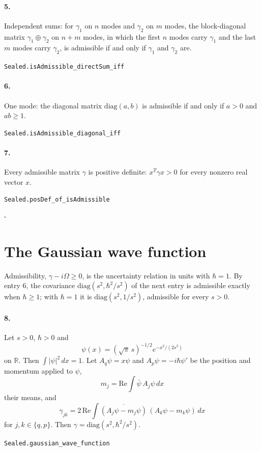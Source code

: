 \documentclass[11pt]{article}
\makeatletter
\newcommand{\keepspace}[1]{\par\penalty-100\begingroup\setlength{\dimen@}{#1}\dimen@ii\pagegoal\advance\dimen@ii-\pagetotal\ifdim\dimen@>\dimen@ii\ifdim\dimen@ii>\z@\vfil\fi\break\fi\endgroup}
\makeatother
\begin{document}
\paragraph{5.} Independent sums: for $\gamma_1$ on $n$ modes and $\gamma_2$ on $m$ modes, the block-diagonal matrix $\gamma_1 \oplus \gamma_2$ on $n + m$ modes, in which the first $n$ modes carry $\gamma_1$ and the last $m$ modes carry $\gamma_2$, is admissible if and only if $\gamma_1$ and $\gamma_2$ are.\par{\footnotesize\texttt{Sealed.isAdmissible\_directSum\_iff}}

\paragraph{6.} One mode: the diagonal matrix $\mathrm{diag}(a, b)$ is admissible if and only if $a > 0$ and $ab \ge 1$.\par{\footnotesize\texttt{Sealed.isAdmissible\_diagonal\_iff}}

\paragraph{7.} Every admissible matrix $\gamma$ is positive definite: $x^T \gamma x > 0$ for every nonzero real vector $x$.\par{\footnotesize\texttt{Sealed.posDef\_of\_isAdmissible}}

\keepspace{14\baselineskip}\section*{The Gaussian wave function}
Admissibility, $\gamma - i\Omega \ge 0$, is the uncertainty relation in units with $\hbar = 1$. By entry 6, the covariance $\mathrm{diag}(s^2, \hbar^2/s^2)$ of the next entry is admissible exactly when $\hbar \ge 1$; with $\hbar = 1$ it is $\mathrm{diag}(s^2, 1/s^2)$, admissible for every $s > 0$.

\paragraph{8.} Let $s > 0$, $\hbar > 0$ and \[\psi(x) = (\sqrt{\pi}\, s)^{-1/2} e^{-x^2/(2s^2)}\] on $\mathbb R$. Then $\int |\psi|^2\, dx = 1$. Let $A_q \psi = x\psi$ and $A_p \psi = -i\hbar\psi'$ be the position and momentum applied to $\psi$, \[m_j = \mathrm{Re} \int \bar\psi\, A_j\psi\, dx\] their means, and \[\gamma_{jk} = 2\, \mathrm{Re} \int \overline{(A_j\psi - m_j\psi)}\, (A_k\psi - m_k\psi)\, dx\] for $j, k \in \{q, p\}$. Then $\gamma = \mathrm{diag}(s^2, \hbar^2/s^2)$.\par{\footnotesize\texttt{Sealed.gaussian\_wave\_function}}
\end{document}
